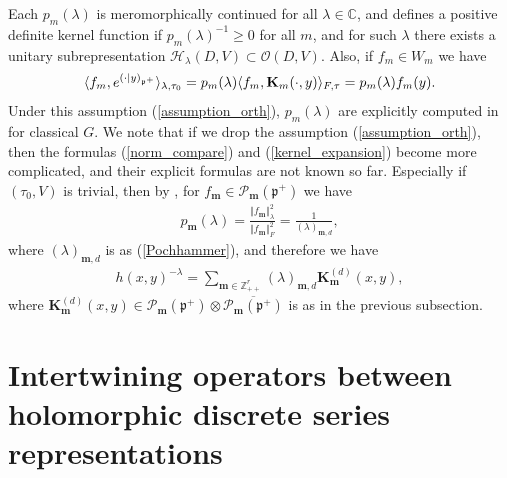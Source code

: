 \documentclass[11pt]{article}
\numberwithin{equation}{section}
\newcommand{\bK}{\mathbf{K}}
\newcommand{\bm}{\mathbf{m}}
\newcommand{\BZ}{\mathbb{Z}}
\newcommand{\BC}{\mathbb{C}}
\newcommand{\fp}{\mathfrak{p}}
\newcommand{\cH}{\mathcal{H}}
\newcommand{\cO}{\mathcal{O}}
\newcommand{\cP}{\mathcal{P}}
\begin{document}
Each $p_m(\lambda)$ is meromorphically continued for all $\lambda\in\BC$, and defines a positive definite kernel function if
$p_m(\lambda)^{-1}\ge 0$ for all $m$, and for such $\lambda$ there exists a unitary subrepresentation $\cH_\lambda(D,V)\subset\cO(D,V)$.
Also, if $f_m\in W_m$ we have
\begin{gather}\label{exp_onD}
\langle f_m,{\rm e}^{(\cdot|y)_{\fp^+}}\rangle_{\lambda,\tau_0}=p_m(\lambda)\langle f_m,\bK_m(\cdot,y)\rangle_{F,\tau}=p_m(\lambda)f_m(y).
\end{gather}
Under this assumption (\ref{assumption_orth}), $p_m(\lambda)$ are explicitly computed in \cite{N2} for classical $G$.
We note that if we drop the assumption (\ref{assumption_orth}), then the formulas (\ref{norm_compare}) and (\ref{kernel_expansion}) become
more complicated, and their explicit formulas are not known so far.
Especially if $(\tau_0,V)$ is trivial,
then by \cite[Part~III, Corollary~V.3.9]{FKKLR}, \cite{FK0} for $f_\bm\in\cP_\bm(\fp^+)$ we have
\begin{gather}\label{scalar_norm}
p_\bm(\lambda)=\frac{\Vert f_\bm\Vert_\lambda^2}{\Vert f_\bm\Vert_F^2}=\frac{1}{(\lambda)_{\bm,d}},
\end{gather}
where $(\lambda)_{\bm,d}$ is as (\ref{Pochhammer}), and therefore we have
\begin{gather}\label{ext_of_h}
h(x,y)^{-\lambda}=\sum_{\bm\in\BZ_{++}^r}(\lambda)_{\bm,d}\bK_\bm^{(d)}(x,y),
\end{gather}
where $\bK_\bm^{(d)}(x,y)\in\cP_\bm(\fp^+)\otimes \overline{\cP_\bm(\fp^+)}$ is as in the previous subsection.

\section[Intertwining operators between holomorphic discrete series representations]{Intertwining operators between holomorphic discrete series\\ representations}\label{section3}
\end{document}
